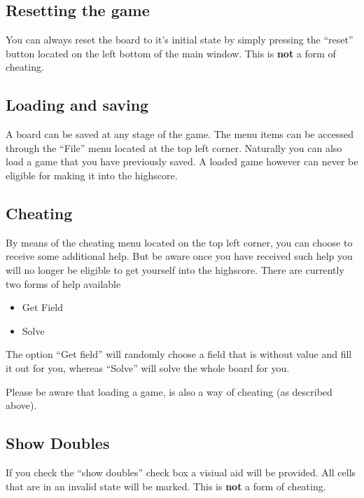 \documentclass[a4paper,11pt]{article}
\begin{document}
\subsection{Resetting the game}

You can always reset the board to it's initial state by simply pressing the ``reset'' button located on the left bottom of the main window. This is \textbf{not} a form of cheating.

\subsection{Loading and saving}

A board can be saved at any stage of the game. The menu items can be accessed through the ``File'' menu located at the top left corner. 
Naturally you can also load a game that you have previously saved. A loaded game however can never be eligible for making it into the highscore.


\subsection{Cheating}
By means of the cheating menu located on the top left corner, you can choose to receive some additional help. But be aware once you have received such help you will no longer be eligible to get yourself into the highscore. There are currently two forms of help available

\begin{itemize}
  \item Get Field
  \item Solve
\end{itemize}

The option ``Get field'' will randomly choose a field that is without value and fill it out for you, whereas ``Solve'' will solve the whole board for you.

Please be aware that loading a game, is also a way of cheating (as described above).

\subsection{Show Doubles}

If you check the ``show doubles'' check box a visiual aid will be provided. All cells that are in an invalid state will be marked. This is \textbf{not} a form of cheating.
\end{document}
